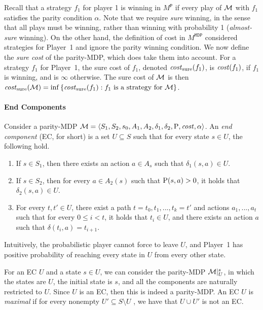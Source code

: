 \documentclass[runningheads,a4paper]{llncs}
\newcommand{\set}[1]{{\{#1\}}}
\newcommand{\zug}[1]{\langle #1  \rangle}
\newcommand{\M}{{\cal M}}
\renewcommand{\P}{{\mathtt P}}
\newcommand{\MDP}{{\mathtt{MDP}}}
\newcommand{\cost}{{\it cost}}
\newcommand{\Act}{A}
\newcommand{\MDPProb}{{\rm P}}
\newcommand{\MDPcost}{{\it cost}}
\newcommand{\costs}{{\it cost}_{\rm sure}}
\begin{document}
Recall that a strategy $f_1$ for player 1 is winning in $M^{\P}$ if every play of $\M$ with $f_1$ satisfies the parity condition $\alpha$. Note that we require {\em sure} winning, in the sense that all plays must be winning, rather than winning with probability 1 ({\em almost-sure} winning). On the other hand, the definition of cost in $M^{\MDP}$ considered strategies for Player~1 and ignore the parity winning condition. We now define the {\em sure cost\/} of the parity-MDP, which does take them into account. 
For a strategy $f_1$ for Player~1, the sure cost of $f_1$, denoted $\costs(f_1)$, is $\cost(f_1)$, if $f_1$ is winning, and is $\infty$ otherwise. The sure cost of $\M$ is then $\costs(\M)=\inf\set{\costs(f_1): f_1\text{ is a strategy for }\M}$.
\vspace*{-8pt}
\paragraph*{End Components}
Consider a parity-MDP $\M=\zug{S_1,S_2,s_0,\Act_1,\Act_2,\delta_1, \delta_2,\MDPProb,\MDPcost,\alpha}$. An {\em end component\/} (EC, for short) is a set $U\subseteq S$ such that for every state $s\in U$, the following hold.

\vspace*{-8pt}
\begin{enumerate}
\item If $s\in S_1$, then there exists an action $a\in \Act_s$ such that $\delta_1(s,a)\in U$.
\item If $s\in S_2$, then for every $a\in \Act_2(s)$ such that $\MDPProb(s,a)>0$, it holds that  $\delta_2(s,a)\in U$.
\item For every $t,t'\in U$, there exist a path $t=t_0,t_1,...,t_k=t'$ and actions $a_1,...,a_t$ such that for every $0\le i< t$, it holds that $t_i\in U$, and there exists an action $a$ such that $\delta(t_i,a)=t_{i+1}$.
\end{enumerate}
Intuitively, the probabilistic player cannot force to leave $U$, and Player~1 has positive probability of reaching every state in $U$ from every other state. 

For an EC $U$ and a state $s\in U$, we can consider the parity-MDP $\M|^s_U$, in which the states are $U$, the initial state is $s$, and all the components are naturally restricted to $U$. Since $U$ is an EC, then this is indeed a parity-MDP. An EC $U$ is {\em maximal\/} if for every nonempty $U' \subseteq S \setminus U$ 
, we have that $U \cup U'$ is not an EC.
\end{document}
